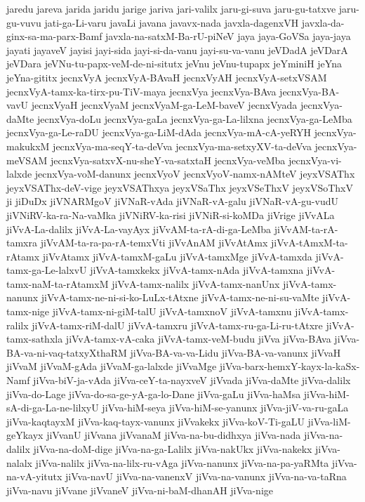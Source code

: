 {jaredu
jareva
jarida
jaridu
jarige
jariva
jari-valilx
jaru-gi-suva
jaru-gu-tatxve
jaru-gu-vuvu
jati-ga-Li-varu
javaLi
javana
javavx-nada
javxla-dagenxVH
javxla-da-ginx-sa-ma-parx-Bamf
javxla-na-satxM-Ba-rU-piNeV
jaya
jaya-GoVSa
jaya-jaya
jayati
jayaveV
jayisi
jayi-sida
jayi-si-da-vanu
jayi-su-va-vanu
jeVDadA
jeVDarA
jeVDara
jeVNu-tu-papx-veM-de-ni-situtx
jeVnu
jeVnu-tupapx
jeYminiH
jeYna
jeYna-gititx
jecnxVyA
jecnxVyA-BAvaH
jecnxVyAH
jecnxVyA-setxVSAM
jecnxVyA-tamx-ka-tirx-pu-TiV-maya
jecnxVya
jecnxVya-BAva
jecnxVya-BA-vavU
jecnxVyaH
jecnxVyaM
jecnxVyaM-ga-LeM-baveV
jecnxVyada
jecnxVya-daMte
jecnxVya-doLu
jecnxVya-gaLa
jecnxVya-ga-La-lilxna
jecnxVya-ga-LeMba
jecnxVya-ga-Le-raDU
jecnxVya-ga-LiM-dAda
jecnxVya-mA-cA-yeRYH
jecnxVya-makukxM
jecnxVya-ma-seqY-ta-deVva
jecnxVya-ma-setxyXV-ta-deVva
jecnxVya-meVSAM
jecnxVya-satxvX-nu-sheY-va-satxtaH
jecnxVya-veMba
jecnxVya-vi-lalxde
jecnxVya-voM-danunx
jecnxVyoV
jecnxVyoV-namx-nAMteV
jeyxVSAThx
jeyxVSAThx-deV-vige
jeyxVSAThxya
jeyxVSaThx
jeyxVSeThxV
jeyxVSoThxV
ji
jiDuDx
jiVNARMgoV
jiVNaR-vAda
jiVNaR-vA-galu
jiVNaR-vA-gu-vudU
jiVNiRV-ka-ra-Na-vaMka
jiVNiRV-ka-risi
jiVNiR-si-koMDa
jiVrige
jiVvALa
jiVvA-La-dalilx
jiVvA-La-vayAyx
jiVvAM-ta-rA-di-ga-LeMba
jiVvAM-ta-rA-tamxra
jiVvAM-ta-ra-pa-rA-temxVti
jiVvAnAM
jiVvAtAmx
jiVvA-tAmxM-ta-rAtamx
jiVvAtamx
jiVvA-tamxM-gaLu
jiVvA-tamxMge
jiVvA-tamxda
jiVvA-tamx-ga-Le-lalxvU
jiVvA-tamxkekx
jiVvA-tamx-nAda
jiVvA-tamxna
jiVvA-tamx-naM-ta-rAtamxM
jiVvA-tamx-nalilx
jiVvA-tamx-nanUnx
jiVvA-tamx-nanunx
jiVvA-tamx-ne-ni-si-ko-LuLx-tAtxne
jiVvA-tamx-ne-ni-su-vaMte
jiVvA-tamx-nige
jiVvA-tamx-ni-giM-talU
jiVvA-tamxnoV
jiVvA-tamxnu
jiVvA-tamx-ralilx
jiVvA-tamx-riM-dalU
jiVvA-tamxru
jiVvA-tamx-ru-ga-Li-ru-tAtxre
jiVvA-tamx-sathxla
jiVvA-tamx-vA-caka
jiVvA-tamx-veM-budu
jiVva
jiVva-BAva
jiVva-BA-va-ni-vaq-tatxyXthaRM
jiVva-BA-va-va-Lidu
jiVva-BA-va-vanunx
jiVvaH
jiVvaM
jiVvaM-gAda
jiVvaM-ga-lalxde
jiVvaMge
jiVva-barx-hemxY-kayx-la-kaSx-Namf
jiVva-biV-ja-vAda
jiVva-ceY-ta-nayxveV
jiVvada
jiVva-daMte
jiVva-dalilx
jiVva-do-Lage
jiVva-do-sa-ge-yA-ga-lo-Dane
jiVva-gaLu
jiVva-haMsa
jiVva-hiM-sA-di-ga-La-ne-lilxyU
jiVva-hiM-seya
jiVva-hiM-se-yanunx
jiVva-jiV-va-ru-gaLa
jiVva-kaqtayxM
jiVva-kaq-tayx-vanunx
jiVvakekx
jiVva-koV-Ti-gaLU
jiVva-liM-geYkayx
jiVvanU
jiVvana
jiVvanaM
jiVva-na-bu-didhxya
jiVva-nada
jiVva-na-dalilx
jiVva-na-doM-dige
jiVva-na-ga-Lalilx
jiVva-nakUkx
jiVva-nakekx
jiVva-nalalx
jiVva-nalilx
jiVva-na-lilx-ru-vAga
jiVva-nanunx
jiVva-na-pa-yaRMta
jiVva-na-vA-yitutx
jiVva-navU
jiVva-na-vanenxV
jiVva-na-vanunx
jiVva-na-va-taRna
jiVva-navu
jiVvane
jiVvaneV
jiVva-ni-baM-dhanAH
jiVva-nige
}
